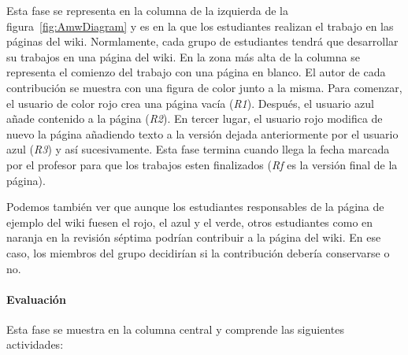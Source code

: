 Esta fase se representa en la columna de la izquierda de la figura~\ref{fig:AmwDiagram} y es en la que los estudiantes realizan el trabajo en las páginas del wiki. Normlamente, cada grupo de estudiantes tendrá que desarrollar su trabajos en una página del wiki. En la zona más alta de la columna se representa el comienzo del trabajo con una página en blanco. El autor de cada contribución se muestra con una figura de color junto a la misma. Para comenzar, el usuario de color rojo crea una página vacía (\emph{R1}). Después, el usuario azul añade contenido a la página (\emph{R2}). En tercer lugar, el usuario rojo modifica de nuevo la página añadiendo texto a la versión dejada anteriormente por el usuario azul (\emph{R3}) y así sucesivamente. Esta fase termina cuando llega la fecha marcada por el profesor para que los trabajos esten finalizados (\emph{Rf} es la versión final de la página).

Podemos también ver que aunque los estudiantes responsables de la página de ejemplo del wiki fuesen el rojo, el azul y el verde, otros estudiantes como en naranja en la revisión séptima podrían contribuir a la página del wiki. En ese caso, los miembros del grupo decidirían si la contribución debería conservarse o no.

\paragraph*{Evaluación}

Esta fase se muestra en la columna central y comprende las siguientes actividades:

